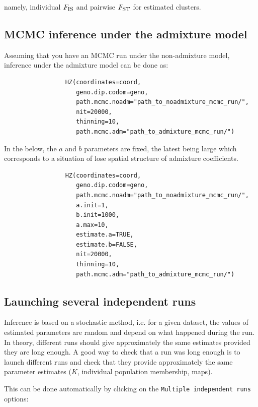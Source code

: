 \documentclass[a4paper,10pt]{article}
\newcommand{\Fst}{F_{\mbox{\footnotesize ST}}}
\newcommand{\Fis}{F_{\mbox{\footnotesize IS}}}
\begin{document}
namely, individual  $\Fis$ and pairwise $\Fst$ for estimated clusters.

\clearpage
\subsection{MCMC inference under the admixture model}
 Assuming that you have an MCMC run under the non-admixture model, inference under the admixture model can be done as:
\begin{verbatim}
                 HZ(coordinates=coord,
                    geno.dip.codom=geno,
                    path.mcmc.noadm="path_to_noadmixture_mcmc_run/",
                    nit=20000,
                    thinning=10,
                    path.mcmc.adm="path_to_admixture_mcmc_run/")  

\end{verbatim}


In the below, the $a$ and $b$ parameters are fixed, the latest being large which corresponds to a situation of lose 
spatial structure of admixture coefficients. 
\begin{verbatim}
                 HZ(coordinates=coord,
                    geno.dip.codom=geno,
                    path.mcmc.noadm="path_to_noadmixture_mcmc_run/",
                    a.init=1,
                    b.init=1000,
                    a.max=10,
                    estimate.a=TRUE,
                    estimate.b=FALSE,
                    nit=20000,
                    thinning=10,
                    path.mcmc.adm="path_to_admixture_mcmc_run/")  

\end{verbatim}




\clearpage
\subsection{Launching several independent runs}

Inference is based on a stochastic method, i.e. for a given dataset, the values of estimated parameters are random and depend 
on what happened during the run. In theory, different runs should give approximately the same estimates provided they are long enough. 
A good way to check that a run was long enough is to launch different runs and check that they provide approximately the same parameter estimates 
($K$, individual population membership, maps).

This can be done automatically by clicking on the \texttt{Multiple independent runs} options:\\
\bigskip
\end{document}
